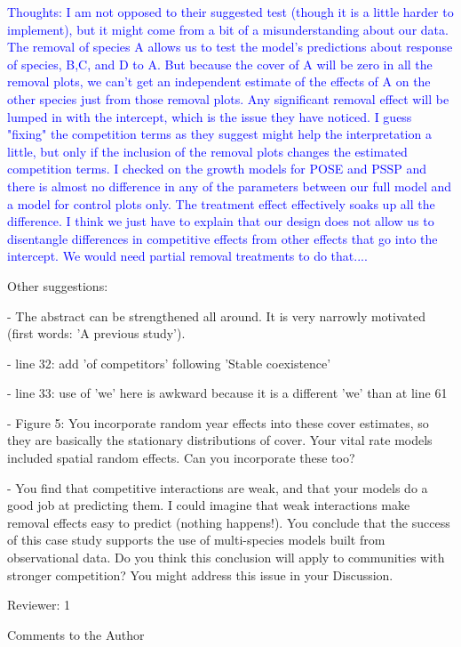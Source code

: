 \documentclass[12pt]{article}
\newcommand{\response}{\textcolor{blue}}
\begin{document}
{\response{ Thoughts: I am not opposed to their suggested test (though it is a little harder to implement), but it might come from a bit of a misunderstanding 
about our data. The removal of species A allows us to test the model's predictions about response of species, B,C, and D to A. But because the cover of A
will be zero in all the removal plots, we can't get an independent estimate of the effects of A on the other species just from those removal plots. 
Any significant removal effect will be lumped in with the intercept, which is the issue they have noticed. I guess "fixing" the competition terms as they
suggest might help the interpretation a little, but only if the inclusion of the removal plots changes the estimated competition terms. I checked on the growth models 
for POSE and PSSP and there is almost no difference in any of the parameters between our full model and a model for control plots only. The treatment effect effectively soaks 
up all the difference. I think we just have to explain that our design does not allow us to disentangle differences in competitive effects from other 
effects that go into the intercept. We would need partial removal treatments to do that....}


Other suggestions:

- The abstract can be strengthened all around. It is very narrowly motivated (first words: 'A previous study').

- line 32: add 'of competitors' following 'Stable coexistence'

- line 33: use of 'we' here is awkward because it is a different 'we' than at line 61

- Figure 5: You incorporate random year effects into these cover estimates, so they are basically the stationary distributions of cover. Your vital rate models included spatial random effects. Can you incorporate these too?

- You find that competitive interactions are weak, and that your models do a good job at predicting them. I could imagine that weak interactions make removal effects easy to predict (nothing happens!). You conclude that the success of this case study supports the use of multi-species models built from observational data. Do you think this conclusion will apply to communities with stronger competition? You might address this issue in your Discussion.

Reviewer: 1

Comments to the Author

}
\end{document}
